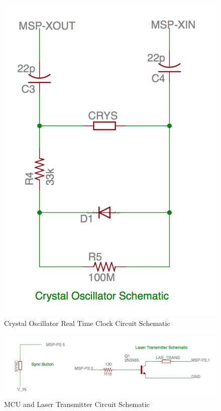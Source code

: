 \documentclass[letterpaper,10pt]{article}
\begin{document}
\begin{spacing}{1.15}
\begin{figure} [H]
	\centering
	\includegraphics[scale=0.35]{oscillator-schematic.png}
	\caption{Crystal Oscillator Real Time Clock Circuit Schematic\label{fig:crystal-oscillator-schematic}}
\end{figure}

\begin{figure} [H]
	\centering
	\includegraphics[scale=0.43]{transmitter-schematic.png}
	\caption{MCU and Laser Transmitter Circuit Schematic\label{fig:mcu-laser-schematic}}
\end{figure}


\end{spacing}
\end{document}
